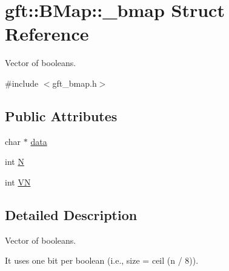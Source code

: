 \hypertarget{structgft_1_1BMap_1_1__bmap}{\section{gft\-:\-:B\-Map\-:\-:\-\_\-bmap Struct Reference}
\label{structgft_1_1BMap_1_1__bmap}
}


Vector of booleans.  




{\ttfamily \#include $<$gft\-\_\-bmap.\-h$>$}

\subsection*{Public Attributes}
\begin{DoxyCompactItemize}
\item 
char $\ast$ \hyperlink{structgft_1_1BMap_1_1__bmap_ae3e7927d064a7336798b41c25f775752}{data}
\item 
int \hyperlink{structgft_1_1BMap_1_1__bmap_ae6e8644f37ce49bafb0a6227afcf2a3b}{N}
\item 
int \hyperlink{structgft_1_1BMap_1_1__bmap_a9cdac1fc2425919764aff0630ef907d2}{V\-N}
\end{DoxyCompactItemize}


\subsection{Detailed Description}
Vector of booleans. 

It uses one bit per boolean (i.\-e., size = ceil (n / 8)). 

